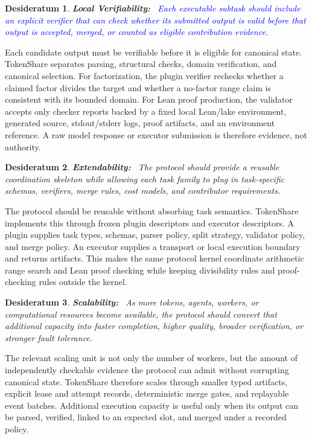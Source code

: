 \documentclass{article}
\theoremstyle{plain}
\newtheorem{desideratum}{Desideratum}
\begin{document}
\begin{desideratum}
\textbf{Local Verifiability:}~ \textcolor{blue}{Each executable subtask should include an explicit verifier that can check whether its submitted output is valid before that output is accepted, merged, or counted as eligible contribution evidence.}
\end{desideratum}

{\color{blue}
Each candidate output must be verifiable before it is eligible for canonical state. TokenShare separates parsing, structural checks, domain verification, and canonical selection. For factorization, the plugin verifier rechecks whether a claimed factor divides the target and whether a no-factor range claim is consistent with its bounded domain. For Lean proof production, the validator accepts only checker reports backed by a fixed local Lean/lake environment, generated source, stdout/stderr logs, proof artifacts, and an environment reference. A raw model response or executor submission is therefore evidence, not authority.
}


\begin{desideratum}
\textbf{Extendability:}~ The protocol should provide a reusable coordination skeleton while allowing each task family to plug in task-specific schemas, verifiers, merge rules, cost models, and contributor requirements.
\end{desideratum}

{\color{blue}
The protocol should be reusable without absorbing task semantics. TokenShare implements this through frozen plugin descriptors and executor descriptors. A plugin supplies task types, schemas, parser policy, split strategy, validator policy, and merge policy. An executor supplies a transport or local execution boundary and returns artifacts. This makes the same protocol kernel coordinate arithmetic range search and Lean proof checking while keeping divisibility rules and proof-checking rules outside the kernel.
}


\begin{desideratum}
\textbf{Scalability:}~ As more tokens, agents, workers, or computational resources become available, the protocol should convert that additional capacity into faster completion, higher quality, broader verification, or stronger fault tolerance.
\end{desideratum}

{\color{blue}
The relevant scaling unit is not only the number of workers, but the amount of independently checkable evidence the protocol can admit without corrupting canonical state. TokenShare therefore scales through smaller typed artifacts, explicit lease and attempt records, deterministic merge gates, and replayable event batches. Additional execution capacity is useful only when its output can be parsed, verified, linked to an expected slot, and merged under a recorded policy.
}
\end{document}

